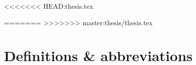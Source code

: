 \documentclass[english,10pt, oneside, a4paper]{scrreprt}
\begin{document}
%

\setcounter{tocdepth}{5}
\setcounter{secnumdepth}{5}


\setcounter{page}{0}






%
%
%

\renewcommand\listfigurename{List of Figures}
\listoffigures
\clearpage
\clearpage
\renewcommand\contentsname{Table of Contents}
\tableofcontents

\setcounter{page}{0}

<<<<<<< HEAD:thesis.tex

=======
%
>>>>>>> master:thesis/thesis.tex
\chapter{Definitions \& abbreviations}

%
%
%
%

\label{bibliography}





\end{document}
